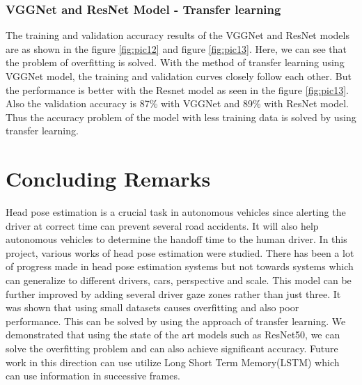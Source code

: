 \documentclass[a4paper, 12pt, oneside, BCOR1cm,toc=chapterentrywithdots]{scrbook}
\begin{document}
\subsection{VGGNet and ResNet Model - Transfer learning}

The training and validation accuracy results of the VGGNet\cite{simonyan_very_2014} and ResNet \cite{noauthor_[1512.03385]_nodate}models are as shown in the figure \ref{fig:pic12} and figure \ref{fig:pic13}. Here, we can see that the problem of overfitting is solved. With the method of transfer learning using VGGNet model, the training and validation curves closely follow each other. But the performance is better with the Resnet model as seen in the figure \ref{fig:pic13}. Also the validation accuracy is 87\% with VGGNet and 89\% with ResNet model. Thus the accuracy problem of the model with less training data is solved by using transfer learning. 



\chapter{Concluding Remarks}

Head pose estimation is a crucial task in autonomous vehicles since alerting the driver at correct time can prevent several road accidents. It will also help autonomous vehicles to determine the handoff time to the human driver. In this project, various works of head pose estimation were studied. There has been a lot of progress made in head pose estimation systems but not towards systems which can generalize to different drivers, cars, perspective and scale. This model can be further improved by adding several driver gaze zones rather than just three. It was shown that using small datasets causes overfitting and also poor performance. This can be solved by using the approach of transfer learning. We demonstrated that using the state of the art models such as ResNet50, we can solve the overfitting problem and can also achieve significant accuracy. Future work in this direction can use utilize Long Short Term Memory(LSTM) \cite{noauthor_long_nodate} which can use information in successive frames. 





\printindex
\end{document}
